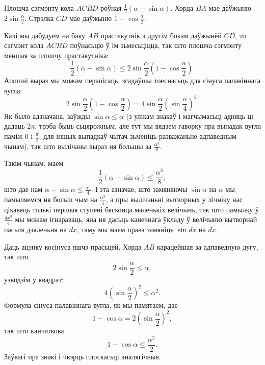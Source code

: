 \documentclass[10pt,a4paper]{book}
\theoremstyle{plain}
\begin{document}
Плошча сэгмэнту кола $ACBD$ роўная $\frac{1}{2}(\alpha - \sin \alpha)$. Хорда $BA$ мае
даўжыню $2 \sin\frac{\alpha}{2}$. Стрэлка $CD$ мае даўжыню $1 -
\cos\frac{\alpha}{2}$.

Калі мы дабудуем на баку $AB$ прастакутнік з другім бокам даўжынёй $CD$, то
сэгмэнт кола $ACBD$ поўнасьцю ў ім зьмесьціцца, так што плошча сэгмэнту меншая
за плошчу прастакутніка:
\begin{equation*}
  \frac{1}{2}(\alpha - \sin \alpha) \leq 2 \sin\frac{\alpha}{2}(1 -
  \cos\frac{\alpha}{2}).
\end{equation*}
Апошні выраз мы можам перапісаць, згадаўшы тоеснасьць для сінуса палавіннага
вугла:
\begin{equation*}
  2\sin\frac{\alpha}{2}(1 - \cos\frac{\alpha}{2}) = 4
  \sin\frac{\alpha}{2}(\sin\frac{\alpha}{4})^2.
\end{equation*}
Як было адзначана, заўжды $\sin \alpha \leq \alpha$ (з улікам знакаў і
магчымасьці адняць ці дадаць $2\pi$, трэба быць сьцярожным, але тут мы вядзем
гаворку пра выпадак вугла паміж $0$ і $\frac{\pi}{2}$, для іншых выпадкаў чытач
зьменіць разважаньне адпаведным чынам), так што вылічаны выраз ня большы за
$\frac{\alpha^3}{8}$.

Такім чынам, маем
\begin{equation*}
  \frac{1}{2}(\alpha - \sin \alpha) \leq \frac{\alpha^3}{8},
\end{equation*}
што дае нам $\alpha - \sin \alpha \leq \frac{\alpha^3}{4}$. Гэта азначае, што
замяняючы $\sin \alpha$ на $\alpha$ мы памыляемся ня больш чым на
$\frac{\alpha^3}{4}$, а пры вылічэньні вытворных у лічніку нас цікавяць толькі
першыя ступені бясконца маленькіх велічынь, так што памылку ў $\frac{dx^3}{4}$
мы можам ігнараваць, яна ня дасьць канечнага ўкладу ў велічыню вытворнай пасьля
дзяленьня на $dx$, таму мы маем права замяніць $\sin dx$ на $dx$.

Даць ацэнку косінуса яшчэ прасьцей. Хорда $AB$ карацейшая за адпаведную дугу,
так што
\begin{equation*}
  2\sin\frac{\alpha}{2} \leq \alpha,
\end{equation*}
узводзім у квадрат:
\begin{equation*}
  4 (\sin\frac{\alpha}{2})^2 \leq \alpha^2.
\end{equation*}
Формула сінуса палавіннага вугла, як мы памятаем, дае
\begin{equation*}
  1 - \cos \alpha  = 2 (\sin \frac{\alpha}{2})^2,
\end{equation*}
так што канчаткова
\begin{equation*}
  1 - \cos \alpha \leq \frac{\alpha^2}{2}.
\end{equation*}
Заўвагі пра знакі і чвэрць плоскасьці аналягічныя.
\end{document}
